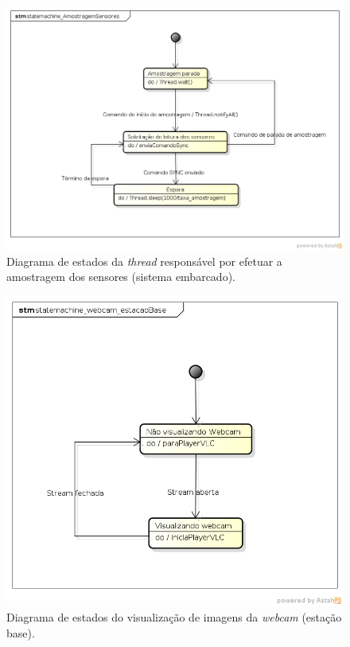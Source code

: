 \begin{figure}[H]
  \centering
  \includegraphics[width=\textwidth, keepaspectratio]{./figuras/sistEmbarcado/statemachine_AmostragemSensores_sistEmbarcado.png}
  \caption{Diagrama de estados da \textit{thread} responsável por efetuar a amostragem dos sensores (sistema embarcado).}
  \label{fig:diagrama_estados_amostragem_sensores_sist_embarcado}
\end{figure}

\begin{figure}[H]
  \centering
  \includegraphics[width=\textwidth, keepaspectratio]{./figuras/estacaoBase/statemachine_webcam_estacaoBase.png}
  \caption{Diagrama de estados do visualização de imagens da \textit{webcam} (estação base).}
  \label{fig:diagrama_estados_webcam_estacao_base}
\end{figure}

